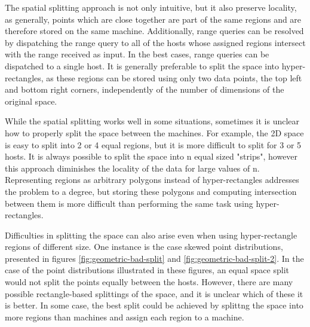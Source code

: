 \documentclass[11pt,a4paper]{globis-book}
\begin{document}
The spatial splitting approach is not only intuitive, but it also preserve locality, as generally, points which are close together are part of the same regions and are therefore stored on the same machine. Additionally, range queries can be resolved by dispatching the range query to all of the hosts whose assigned regions intersect with the range received as input. In the best cases, range queries can be dispatched to a single host. It is generally preferable to split the space into hyper-rectangles, as these regions can be stored using only two data points, the top left and bottom right corners, independently of the number of dimensions of the original space. 

While the spatial splitting works well in some situations, sometimes it is unclear how to properly split the space between the machines. For example, the 2D space is easy to split into 2 or 4 equal regions, but it is more difficult to split for 3 or 5 hosts. It is always possible to split the space into n equal sized "strips", however this approach diminishes the locality of the data for large values of n. Representing regions as arbitrary polygons instead of hyper-rectangles addresses the problem to a degree, but storing these polygons and computing intersection between them is more difficult than performing the same task using hyper-rectangles. 

Difficulties in splitting the space can also arise even when using hyper-rectangle regions of different size. One instance is the case skewed point distributions, presented in figures \ref{fig:geometric-bad-split} and \ref{fig:geometric-bad-split-2}. In the case of the point distributions illustrated in these figures, an equal space split would not split the points equally between the hosts. However, there are many possible rectangle-based splittings of the space, and it is unclear which of these it is better. In some case, the best split could be achieved by splittng the space into more regions than machines and assign each region to a machine.
\end{document}
